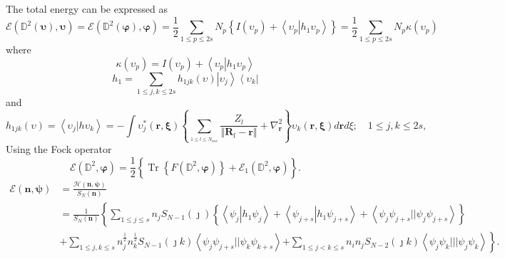 \documentclass[aps,preprint]{revtex4}%
\begin{document}
The total energy can be expressed as
\begin{equation}
\mathcal{E}\left(  \mathbb{D}^{2}\left(  \bm{\upsilon}\right)
,\bm{\upsilon}\right)  =\mathcal{E}\left(  \mathbb{D}^{2}\left(
\bm{\varphi}\right)  ,\bm{\varphi}\right)  =\frac{1}{2}\sum_{1\leq p\leq
2s}N_{p}\left\{  I\left(  \upsilon_{p}\right)  +\left\langle \left.
\upsilon_{p}\right\vert h_{1}\upsilon_{p}\right\rangle \right\}  =\frac{1}{2}%
{\textstyle\sum\limits_{1\leq p\leq2s}}
N_{p}\kappa\left(  \upsilon_{p}\right)
\end{equation}
where
\begin{equation}
\kappa\left(  \upsilon_{p}\right)  =I\left(  \upsilon_{p}\right)
+\left\langle \left.  \upsilon_{p}\right\vert h_{1}\upsilon_{p}\right\rangle
\end{equation}%
\begin{equation}
h_{1}=\sum_{1\leq j,k\leq2s}h_{1jk}\left(  \upsilon\right)  \left\vert
\upsilon_{j}\right\rangle \left\langle \upsilon_{k}\right\vert
\end{equation}
and
\begin{equation}
h_{1jk}\left(  \upsilon\right)  =\left\langle \upsilon_{j}\left\vert h\right.
\upsilon_{k}\right\rangle =-\int\upsilon_{j}^{\ast}\left(  \bm{r,\xi}\right)
\left\{  \sum_{_{1\leq l\leq N_{nuc}}}\frac{Z_{l}}{\left\Vert \bm{R}_{l}%
-\bm{r}\right\Vert }+\nabla_{\bm{r}}^{2}\right\}  \upsilon_{k}\left(
\bm{r,\xi}\right)  d\bm{r}d\xi;\quad1\leq j,k\leq2s,\label{h1}%
\end{equation}
Using the Fock operator
\begin{equation}
\mathcal{E}\left(  \mathbb{D}^{2},\bm{\varphi}\right)  =\frac{1}{2}\left\{
\overset{}{\operatorname{Tr}\left\{  F\left(  \mathbb{D}^{2}%
,\bm{\varphi}\right)  \right\}  +\mathcal{E}_{1}\left(  \mathbb{D}%
^{2},\bm{\varphi}\right)  }\right\}  .
\end{equation}%
\begin{align}
\mathcal{E}\left(  \mathbf{n,\psi}\right)   &  =\frac{\mathcal{H}\left(
\mathbf{n,\psi}\right)  }{S_{N}\left(  \mathbf{n}\right)  }\nonumber\\
&  =\frac{1}{S_{N}\left(  \mathbf{n}\right)  }\left\{  \sum_{1\leq j\leq
s}n_{j}S_{N-1}\left(  \jmath\right)  \left\{  \left\langle \psi_{j}\left\vert
h_{1}\psi_{j}\right.  \right\rangle +\left\langle \psi_{j+s}\left\vert
h_{1}\psi_{j+s}\right.  \right\rangle +\left\langle \psi_{j}\psi_{j+s}%
||\psi_{j}\psi_{j+s}\right\rangle \right\}  \right.  \nonumber\\
&  +\sum_{1\leq j,k\leq s}n_{j}^{\frac{1}{2}}n_{k}^{\frac{1}{2}}S_{N-1}\left(
\jmath k\right)  \left\langle \psi_{j}\psi_{j+s}||\psi_{k}\psi_{k+s}%
\right\rangle \left.  +\sum_{1\leq j<k\leq s}n_{i}n_{j}S_{N-2}\left(  \jmath
k\right)  \left\langle \psi_{j}\psi_{k}|||\psi_{j}\psi_{k}\right\rangle
\right\}  .\label{energy}%
\end{align}%
\end{document}
